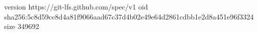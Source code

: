 version https://git-lfs.github.com/spec/v1
oid sha256:5c8d59cc8d4a81f9066aad67c37d4b02e49e64d2861cdbb1e2d8a451e96f3324
size 349692
